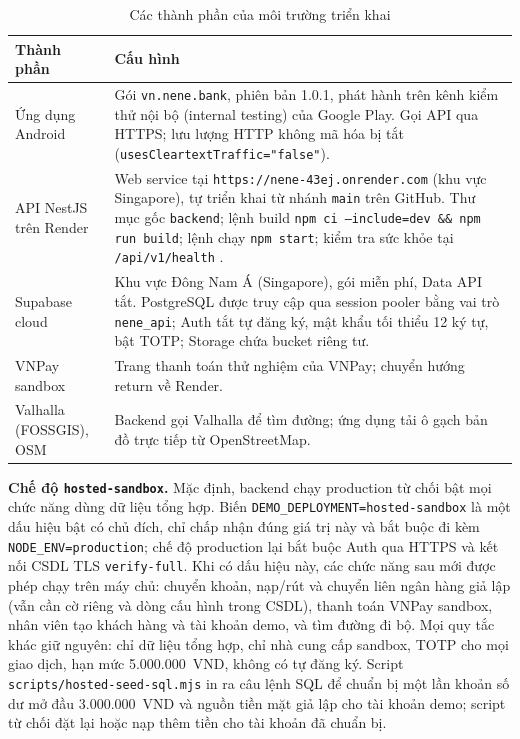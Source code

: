 \begin{table}[H]
	\centering
	\caption{Các thành phần của môi trường triển khai}
	\label{tab:ch3-deploy}
	\footnotesize
	\begin{tabularx}{\textwidth}{@{}>{\raggedright\arraybackslash}p{3.4cm}X@{}}
		\toprule
		\textbf{Thành phần} & \textbf{Cấu hình}\\
		\midrule
		Ứng dụng Android & Gói \texttt{vn.\allowbreak{}nene.\allowbreak{}bank}, phiên bản 1.0.1, phát hành trên kênh kiểm thử nội bộ (internal testing) của Google Play. Gọi API qua HTTPS; lưu lượng HTTP không mã hóa bị tắt (\texttt{uses\allowbreak{}Cleartext\allowbreak{}Traffic="false"}).\\
		API NestJS trên Render & Web service tại \texttt{https:/\allowbreak{}/\allowbreak{}nene-\allowbreak{}43ej.\allowbreak{}onrender.\allowbreak{}com} (khu vực Singapore), tự triển khai từ nhánh \texttt{main} trên GitHub. Thư mục gốc \texttt{backend}; lệnh build \texttt{npm ci --include=dev \&\& npm run build}; lệnh chạy \texttt{npm start}; kiểm tra sức khỏe tại \texttt{/\allowbreak{}api/\allowbreak{}v1/\allowbreak{}health} \parencite{ch2-render}.\\
		Supabase cloud & Khu vực Đông Nam Á (Singapore), gói miễn phí, Data API tắt. PostgreSQL được truy cập qua session pooler bằng vai trò \texttt{nene\_\allowbreak{}api}; Auth tắt tự đăng ký, mật khẩu tối thiểu 12 ký tự, bật TOTP; Storage chứa bucket riêng tư.\\
		VNPay sandbox & Trang thanh toán thử nghiệm của VNPay; chuyển hướng return về Render.\\
		Valhalla (FOSSGIS), OSM & Backend gọi Valhalla để tìm đường; ứng dụng tải ô gạch bản đồ trực tiếp từ OpenStreetMap.\\
		\bottomrule
	\end{tabularx}
\end{table}

\textbf{Chế độ \texttt{hosted-\allowbreak{}sandbox}.} Mặc định, backend chạy production từ chối bật mọi chức năng dùng dữ liệu tổng hợp. Biến \texttt{DEMO\_\allowbreak{}DEPLOYMENT=hosted-\allowbreak{}sandbox} là một dấu hiệu bật có chủ đích, chỉ chấp nhận đúng giá trị này và bắt buộc đi kèm \texttt{NODE\_\allowbreak{}ENV=production}; chế độ production lại bắt buộc Auth qua HTTPS và kết nối CSDL TLS \texttt{verify-\allowbreak{}full}. Khi có dấu hiệu này, các chức năng sau mới được phép chạy trên máy chủ: chuyển khoản, nạp/rút và chuyển liên ngân hàng giả lập (vẫn cần cờ riêng và dòng cấu hình trong CSDL), thanh toán VNPay sandbox, nhân viên tạo khách hàng và tài khoản demo, và tìm đường đi bộ. Mọi quy tắc khác giữ nguyên: chỉ dữ liệu tổng hợp, chỉ nhà cung cấp sandbox, TOTP cho mọi giao dịch, hạn mức 5.000.000~VND, không có tự đăng ký. Script \texttt{scripts/\allowbreak{}hosted-\allowbreak{}seed-\allowbreak{}sql.\allowbreak{}mjs} in ra câu lệnh SQL để chuẩn bị một lần khoản số dư mở đầu 3.000.000~VND và nguồn tiền mặt giả lập cho tài khoản demo; script từ chối đặt lại hoặc nạp thêm tiền cho tài khoản đã chuẩn bị.

